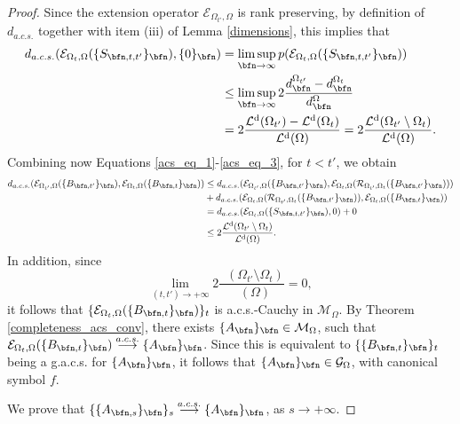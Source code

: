 \documentclass{amsart}
\DeclareMathOperator{\Ld}{\mathcal{L}^d}
\begin{document}
\begin{proof}
    Since the extension operator $\mathcal{E}_{\Omega_{t'},\Omega}$ is rank preserving, by definition of $d_{a.c.s.}$ together with item (iii) of Lemma \ref{dimensions}, this implies that 
    \begin{align}\label{acs_eq_3}
        d_{a.c.s.}(\mathcal{E}_{\Omega_t,\Omega}(\{S_{\bfn,t,t'}\}_\bfn),\{0\}_\bfn)&=\limsup\limits_{\bfn\to\infty} p(\mathcal{E}_{\Omega_t,\Omega}(\{S_{\bfn,t,t'}\}_\bfn))\\
       \nonumber &\leq\limsup\limits_{\bfn\to\infty}2\frac{d_\bfn^{\Omega_{t'}}-d_\bfn^{\Omega_t}}{d_\bfn^{\Omega}}\\
       \nonumber &=2\frac{\Ld(\Omega_{t'})-\Ld(\Omega_t)}{\Ld(\Omega)}=2\frac{\Ld(\Omega_{t'}\setminus\Omega_t)}{\Ld(\Omega)}.
    \end{align}
    Combining now Equations \eqref{acs_eq_1}-\eqref{acs_eq_3}, for $t<t'$, we obtain
    \begin{align*}
        d_{a.c.s.}(\mathcal{E}_{\Omega_{t'},\Omega}(\{B_{\bfn,t'}\}_\bfn),\mathcal{E}_{\Omega_t,\Omega}(\{B_{\bfn,t}\}_\bfn))&\leq d_{a.c.s.}(\mathcal{E}_{\Omega_{t'},\Omega}(\{B_{\bfn,t'}\}_\bfn),\mathcal{E}_{\Omega_t,\Omega}(\mathcal{R}_{\Omega_{t'},\Omega_t}(\{B_{\bfn,t'}\}_\bfn)))\\
        &+d_{a.c.s.}(\mathcal{E}_{\Omega_t,\Omega}(\mathcal{R}_{\Omega_{t'},\Omega_t}(\{B_{\bfn,t'}\}_\bfn)),\mathcal{E}_{\Omega_t,\Omega}(\{B_{\bfn,t}\}_\bfn))\\
        &=d_{a.c.s.}(\mathcal{E}_{\Omega_t,\Omega}(\{S_{\bfn,t,t'}\}_\bfn),0)+0\\
        &\leq 2\frac{\Ld(\Omega_{t'}\setminus\Omega_t)}{\Ld(\Omega)}.
    \end{align*}
    In addition, since 
    \begin{equation*}
        \lim\limits_{(t,t')\to+\infty}2\frac{\Ld(\Omega_{t'}\setminus\Omega_t)}{\Ld(\Omega)}=0,
    \end{equation*}
   it follows that $\{\mathcal{E}_{\Omega_t,\Omega}(\{B_{\bfn,t}\}_\bfn)\}_t$ is a.c.s.-Cauchy in $\mathcal{M}_\Omega$. By Theorem \ref{completeness_acs_conv}, there exists $\{A_\bfn\}_\bfn\in\mathcal{M}_\Omega$, such that $\mathcal{E}_{\Omega_t,\Omega}(\{B_{\bfn,t}\}_\bfn)\overset{a.c.s.}{\longrightarrow}\{A_\bfn\}_\bfn$. Since this is equivalent to $\{\{B_{\bfn,t}\}_\bfn\}_t$ being a g.a.c.s. for $\{A_\bfn\}_\bfn$, it follows that $\{A_\bfn\}_\bfn\in\mathcal{G}_{\Omega}$, with canonical symbol $f$. 

    We prove that $\{\{A_{\bfn,s}\}_\bfn\}_s\overset{a.c.s.}{\longrightarrow}\{A_\bfn\}_\bfn$, as $s\to+\infty$.
   

\end{proof}
\end{document}
